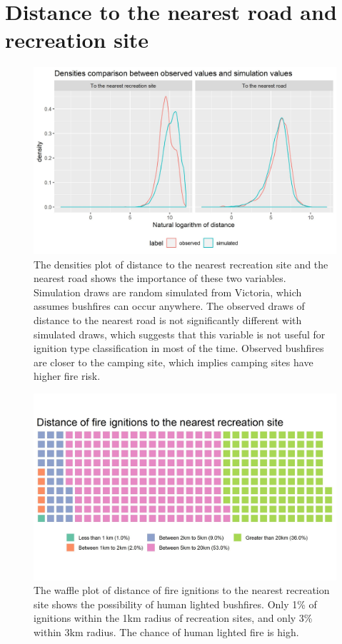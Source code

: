 \documentclass{monashthesis}
\begin{document}
\section{Distance to the nearest road and recreation
site}\label{distance-to-the-nearest-road-and-recreation-site}

\begin{figure}
\centering
\includegraphics[width=5.20833in]{figures/dist_to_camp_and_road.jpg}
\caption{The densities plot of distance to the nearest recreation site
and the nearest road shows the importance of these two variables.
Simulation draws are random simulated from Victoria, which assumes
bushfires can occur anywhere. The observed draws of distance to the
nearest road is not significantly different with simulated draws, which
suggests that this variable is not useful for ignition type
classification in most of the time. Observed bushfires are closer to the
camping site, which implies camping sites have higher fire risk.}
\end{figure}

\begin{figure}
\centering
\includegraphics[width=5.20833in]{figures/dist_to_camp_waffle.jpg}
\caption{The waffle plot of distance of fire ignitions to the nearest
recreation site shows the possibility of human lighted bushfires. Only
1\% of ignitions within the 1km radius of recreation sites, and only 3\%
within 3km radius. The chance of human lighted fire is high.}
\end{figure}
\end{document}
